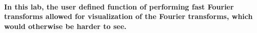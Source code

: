 \documentclass[12pt,a4paper]{article}
\begin{document}
\paragraph{In this lab, the user defined function of performing fast Fourier transforms allowed for visualization of the Fourier transforms, which would otherwise be harder to see.}





\end{document}
